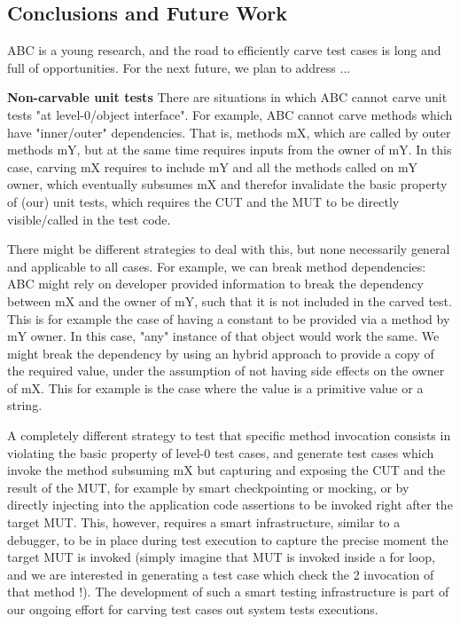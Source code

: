 \documentclass[10pt,conference]{IEEEtran}
\newcommand{\abc}{\textsf{ABC}\xspace}
\begin{document}
{%

\subsection{Conclusions and Future Work}


\abc is a young research, and the road to efficiently carve test cases is long and full of opportunities.
For the next future, we plan to address ...

\textbf{Non-carvable unit tests}
There are situations in which \abc cannot carve unit tests "at level-0/object interface". For example, \abc cannot carve methods which have "inner/outer" dependencies. That is, methods mX, which are called by outer methods mY, but at the same time requires inputs from the owner of mY. In this case, carving mX requires to include mY and all the methods called on mY owner, which eventually subsumes mX and therefor invalidate the basic property of (our) unit tests, which requires the CUT and the MUT to be directly visible/called in the test code. 

There might be different strategies to deal with this, but none necessarily general and applicable to all cases.
For example, we can break method dependencies: \abc might rely on developer provided information to break the dependency between mX and the owner of mY, such that it is not included in the carved test. This is for example the case of having a constant to be provided via a method by mY owner. In this case, "any" instance of that object would work the same. We might break the dependency by using an hybrid approach to provide a copy of the required value, under the assumption of not having side effects on the owner of mX. This for example is the case where the value is a primitive value or a string. 

A completely different strategy to test that specific method invocation consists in violating the basic property of level-0 test cases, and generate test cases which invoke the method subsuming mX but capturing and exposing the CUT and the result of the MUT, for example by smart checkpointing or mocking, or by directly injecting into the application code assertions to be invoked right after the target MUT. This, however, requires a smart infrastructure, similar to a debugger, to be in place during test execution to capture the precise moment the target MUT is invoked (simply imagine that MUT is invoked inside a for loop, and we are interested in generating a test case which check the 2 invocation of that method !). The development of such a smart testing infrastructure is part of our ongoing effort for carving test cases out system tests executions. 

}
\end{document}

